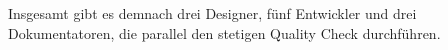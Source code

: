 \documentclass[12pt,a4paper]{article}
\begin{document}
%
%
%
\newline
\newline
Insgesamt gibt es demnach drei Designer, fünf Entwickler und drei Dokumentatoren, die parallel den stetigen Quality Check durchführen.
\\
\end{document}
